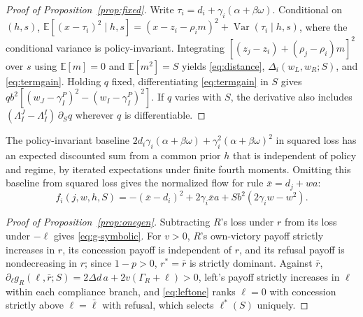 \documentclass[11pt,letterpaper]{article}
\newcommand{\E}{\mathbb E}
\newcommand{\Var}{\operatorname{Var}}
\newcommand{\Dd}{\Delta d}
\begin{document}
\begin{proof}[Proof of Proposition~\ref{prop:fixed}]
Write $\tau_i=d_i+\gamma_i(\alpha+\beta\omega)$. Conditional on $(h,s)$, $\E[(x-\tau_i)^2\mid h,s]=(x-z_i-\rho_i m)^2+\Var(\tau_i\mid h,s)$, where the conditional variance is policy-invariant. Integrating $[(z_j-z_i)+(\rho_j-\rho_i)m]^2$ over $s$ using $\E[m]=0$ and $\E[m^2]=S$ yields \eqref{eq:distance}, $\Delta_i(w_L,w_R;S)$, and \eqref{eq:termgain}. Holding $q$ fixed, differentiating \eqref{eq:termgain} in $S$ gives $qb^2[(w_J-\gamma_I^P)^2-(w_I-\gamma_I^P)^2]$. If $q$ varies with $S$, the derivative also includes $(\Lambda_I^J-\Lambda_I^I)\,\partial_S q$ wherever $q$ is differentiable.
\end{proof}

The policy-invariant baseline $2d_i\gamma_i(\alpha+\beta\omega)+\gamma_i^2(\alpha+\beta\omega)^2$ in squared loss has an expected discounted sum from a common prior $h$ that is independent of policy and regime, by iterated expectations under finite fourth moments. Omitting this baseline from squared loss gives the normalized flow for rule $\bar x=d_j+wa$:
\begin{equation}
 f_i(j,w,h,S)=-(\bar x-d_i)^2+2\gamma_i\bar x a
                    +S b^2(2\gamma_i w-w^2).
 \label{eq:flow}
\end{equation}

\begin{proof}[Proof of Proposition~\ref{prop:onegen}]
Subtracting $R$'s loss under $r$ from its loss under $-\ell$ gives \eqref{eq:g-symbolic}. For $v>0$, $R$'s own-victory payoff strictly increases in $r$, its concession payoff is independent of $r$, and its refusal payoff is nondecreasing in $r$; since $1-p>0$, $r^*=\bar r$ is strictly dominant. Against $\bar r$, $\partial_\ell g_R(\ell,\bar r;S)=2\Dd\,a+2v(\Gamma_R+\ell)>0$, left's payoff strictly increases in $\ell$ within each compliance branch, and \eqref{eq:leftone} ranks $\ell=0$ with concession strictly above $\ell=\bar\ell$ with refusal, which selects $\ell^*(S)$ uniquely.
\end{proof}
\end{document}
